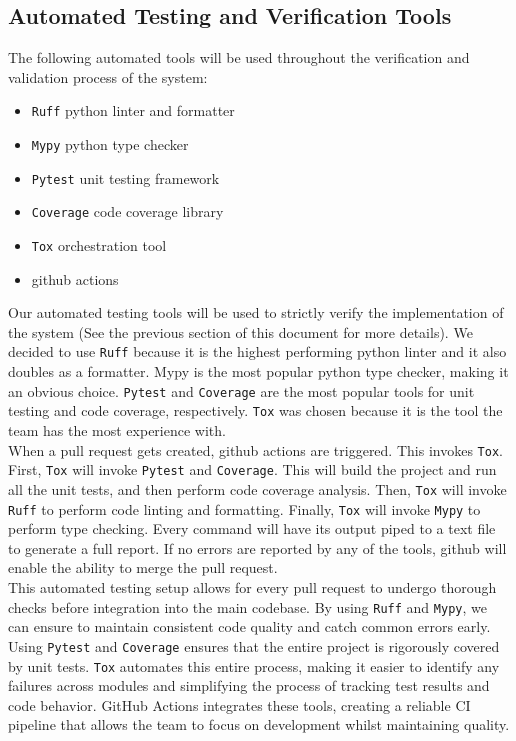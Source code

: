 \documentclass[12pt, titlepage]{article}
\begin{document}
\subsection{Automated Testing and Verification Tools}
The following automated tools will be used throughout the verification and validation
process of the system:
\begin{itemize}
  \item \texttt{Ruff} python linter and formatter
  \item \texttt{Mypy} python type checker
  \item \texttt{Pytest} unit testing framework
  \item \texttt{Coverage} code coverage library
  \item \texttt{Tox} orchestration tool
  \item github actions
\end{itemize}

\noindent
Our automated testing tools will be used to strictly verify the implementation of the system
(See the previous section of this document for more details). We decided to use \texttt{Ruff}
because it is the highest performing python linter and it also doubles as a formatter. Mypy is the most
popular python type checker, making it an obvious choice. \texttt{Pytest} and \texttt{Coverage} are the
most popular tools for unit testing and code coverage, respectively. \texttt{Tox} was chosen because
it is the tool the team has the most experience with.\\

\noindent
When a pull request gets created, github actions are triggered. This invokes \texttt{Tox}. First,
\texttt{Tox} will invoke \texttt{Pytest} and \texttt{Coverage}. This will build the project and run
all the unit tests, and then perform code coverage analysis. Then, \texttt{Tox} will invoke \texttt{Ruff}
to perform code linting and formatting. Finally, \texttt{Tox} will invoke \texttt{Mypy} to perform type
checking. Every command will have its output piped to a text file to generate a full report. If no errors
are reported by any of the tools, github will enable the ability to merge the pull request.\\

\noindent
This automated testing setup allows for every pull request to undergo thorough checks before integration
into the main codebase. By using \texttt{Ruff} and \texttt{Mypy}, we can ensure to maintain consistent
code quality and catch common errors early. Using \texttt{Pytest} and \texttt{Coverage} ensures that the 
entire project is rigorously covered by unit tests. \texttt{Tox} automates this entire process, making it easier
 to identify any failures across modules and simplifying the process of tracking test results and code behavior. 
 GitHub Actions integrates these tools, creating a reliable CI pipeline that allows the team to focus on development
whilst maintaining quality.
\end{document}
